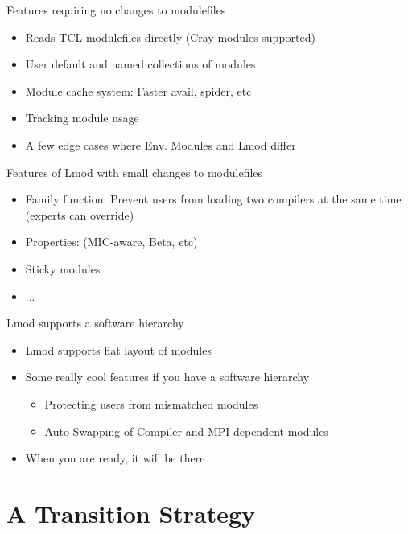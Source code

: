 \documentclass{beamer}
\begin{document}
\begin{frame}{Features requiring no changes to modulefiles}
  \begin{itemize}
    \item Reads TCL modulefiles directly (Cray modules supported)
    \item User default and named collections of modules
    \item Module cache system: Faster avail, spider, etc
    \item Tracking module usage
    \item A few edge cases where Env. Modules and Lmod differ
  \end{itemize}
\end{frame}

\begin{frame}{Features of Lmod with small changes to modulefiles}
  \begin{itemize}
    \item Family function: Prevent users from loading two compilers at
      the same time (experts can override)
    \item Properties: (MIC-aware, Beta, etc)
    \item Sticky modules
    \item ...
  \end{itemize}
\end{frame}

\begin{frame}{Lmod supports a software hierarchy}
  \begin{itemize}
    \item Lmod supports flat layout of modules
    \item Some really cool features if you have a software hierarchy
      \begin{itemize}
        \item Protecting users from mismatched modules
        \item Auto Swapping of Compiler and MPI dependent modules
      \end{itemize}
    \item When you are ready, it will be there
  \end{itemize}
\end{frame}

\section{A Transition Strategy}
\end{document}
